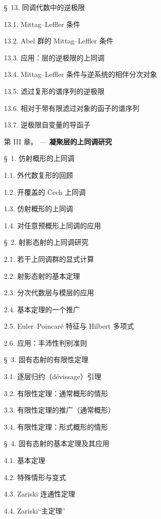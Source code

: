 \documentclass[UTF8,fontset=none,11pt,oneside,openany]{ctexbook}
\begin{document}
\begin{flushleft}
\S~13. 同调代数中的逆极限 

13.1. Mittag--Leffler 条件 

13.2. Abel 群的 Mittag--Leffler 条件 

13.3. 应用：层的逆极限的上同调 

13.4. Mittag--Leffler 条件与逆系统的相伴分次对象 

13.5. 滤过复形的谱序列的逆极限 

13.6. 相对于带有限滤过对象的函子的谱序列 

13.7. 逆极限自变量的导函子 

\medskip
\textsc{第 III 章。} --- \textbf{凝聚层的上同调研究} 

\medskip
\S~1. 仿射概形的上同调 

1.1. 外代数复形的回顾 

1.2. 开覆盖的 Čech 上同调 

1.3. 仿射概形的上同调 

1.4. 对任意预概形上同调的应用 

\medskip
\S~2. 射影态射的上同调研究 

2.1. 若干上同调群的显式计算 

2.2. 射影态射的基本定理 

2.3. 分次代数层与模层的应用 

2.4. 基本定理的一个推广 

2.5. Euler--Poincaré 特征与 Hilbert 多项式 

2.6. 应用：丰沛性判别准则 

\medskip
\S~3. 固有态射的有限性定理 

3.1. 逐层归约（dévissage）引理 

3.2. 有限性定理：通常概形的情形 

3.3. 有限性定理的推广（通常概形） 

3.4. 有限性定理：形式概形的情形 

\medskip
\S~4. 固有态射的基本定理及其应用 

4.1. 基本定理 

4.2. 特殊情形与变式 

4.3. Zariski 连通性定理 

4.4. Zariski“主定理” 


\end{flushleft}
\end{document}
